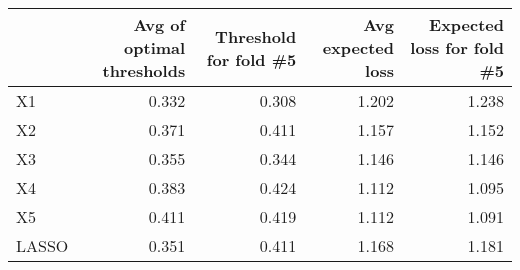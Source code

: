 
\begin{tabular}{lrrrr}
\toprule
  & Avg of optimal thresholds & Threshold for fold \#5 & Avg expected loss & Expected loss for fold \#5\\
\midrule
X1 & 0.332 & 0.308 & 1.202 & 1.238\\
X2 & 0.371 & 0.411 & 1.157 & 1.152\\
X3 & 0.355 & 0.344 & 1.146 & 1.146\\
X4 & 0.383 & 0.424 & 1.112 & 1.095\\
X5 & 0.411 & 0.419 & 1.112 & 1.091\\
LASSO & 0.351 & 0.411 & 1.168 & 1.181\\
\bottomrule
\end{tabular}